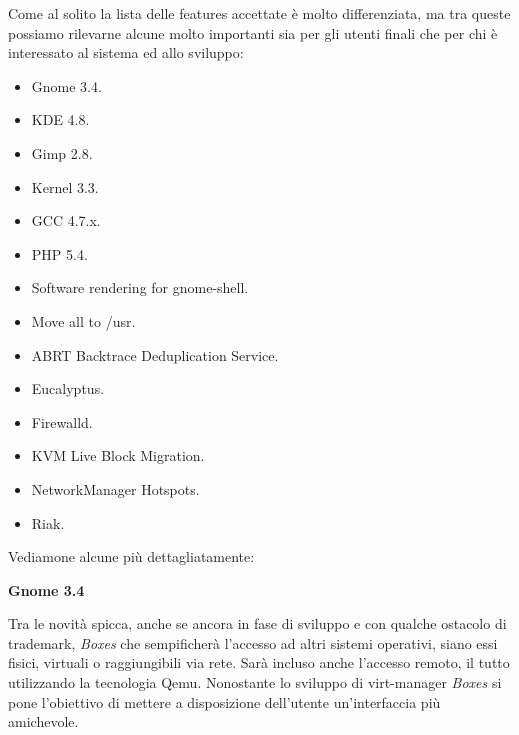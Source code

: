 Come al solito la lista delle features accettate è molto differenziata, ma tra queste possiamo rilevarne alcune molto importanti sia per gli utenti finali che per chi è interessato al sistema ed allo sviluppo:
\begin{itemize}
\item Gnome 3.4.
\item KDE 4.8.
\item Gimp 2.8.
\item Kernel 3.3.
\item GCC 4.7.x.
\item PHP 5.4.
\item Software rendering for gnome-shell.
\item Move all to /usr.
\item ABRT Backtrace Deduplication Service.
\item Eucalyptus.
\item Firewalld.
\item KVM Live Block Migration.
\item NetworkManager Hotspots.
\item Riak.
\end{itemize}

Vediamone alcune più dettagliatamente:\\

\begin{center}
{\centering\bfseries Gnome 3.4}
\end{center}
Tra le novità spicca, anche se ancora in fase di sviluppo e con qualche ostacolo di trademark, {\itshape Boxes} che sempificherà l'accesso ad altri sistemi operativi, siano essi fisici, virtuali o raggiungibili via rete. Sarà incluso anche l'accesso remoto, il tutto utilizzando la tecnologia Qemu. Nonostante lo sviluppo di virt-manager {\itshape Boxes} si pone l'obiettivo di mettere a disposizione dell'utente un'interfaccia più amichevole.

